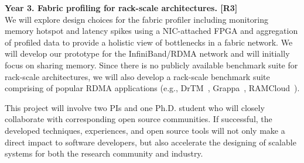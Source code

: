 \item \textbf{Year 3. Fabric profiling for rack-scale architectures.
  {[R3]}} \\
  We will explore design choices for the fabric profiler including
  monitoring memory hotspot and latency spikes using a NIC-attached
  FPGA and aggregation of profiled data to provide a holistic view of
  bottlenecks in a fabric network. We will develop our prototype for the
  InfiniBand/RDMA network and will initially focus on sharing memory.
  Since there is no publicly available benchmark suite for rack-scale
  architectures, we will also develop a rack-scale benchmark suite comprising
  of popular RDMA applications (e.g., DrTM~\cite{drtm:sosp15},
  Grappa~\cite{grappa:atc15}, RAMCloud~\cite{john:ramcloud}).
\squishend

This project will involve two PIs and one Ph.D. student who will
closely collaborate with corresponding open source communities. If
successful, the developed techniques, experiences, and open source
tools will not only make a direct impact to software developers, but
also accelerate the designing of scalable systems for both the research
community and industry.
